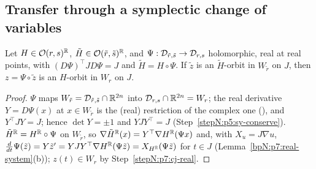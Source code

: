 \subsection{Transfer through a symplectic change of variables}\label{bpN:p7:s-transfer}

\begin{lemma}\label{bpN:p7:conjugation}
Let $H\in\mathcal O(r,s)^{\mathbb{R}}$, $\tilde H\in\mathcal O(\tilde r,\tilde s)^{\mathbb{R}}$, and $\Psi:\mathcal D_{\tilde r,\tilde s}\to\mathcal D_{r,s}$ holomorphic, real at real points, with $(D\Psi)^\top JD\Psi=J$ and $\tilde H=H\circ\Psi$. If $\tilde z$ is an $\tilde H$-orbit in $W_{\tilde r}$ on $J$, then $z=\Psi\circ\tilde z$ is an $H$-orbit in $W_r$ on $J$.
\end{lemma}
\begin{proof}
\label{stepN:p7:cj-real} $\Psi$ maps $W_{\tilde r}=\mathcal D_{\tilde r,\tilde s}\cap\mathbb{R}^{2n}$ into $\mathcal D_{r,s}\cap\mathbb{R}^{2n}=W_r$; the real derivative $Y=D\Psi(x)$ at $x\in W_{\tilde r}$ is the (real) restriction of the complex one (), and $Y^\top JY=J$; hence $\det Y=\pm1$ and $YJY^\top=J$ (Step~\ref{stepN:p5:sy-conserve}).
\label{stepN:p7:cj-chain} $\tilde H^{\mathbb{R}}=H^{\mathbb{R}}\circ\Psi$ on $W_{\tilde r}$, so $\nabla\tilde H^{\mathbb{R}}(x)=Y^\top\nabla H^{\mathbb{R}}(\Psi x)$ and, with $X_u=J\nabla u$, $\frac d{dt}\Psi(\tilde z)=Y\tilde z'=YJY^\top\nabla H^{\mathbb{R}}(\Psi\tilde z)=X_{H^{\mathbb{R}}}(\Psi\tilde z)$ for $t\in J$ (Lemma~\ref{bpN:p7:real-system}(b)); $z(t)\in W_r$ by Step~\ref{stepN:p7:cj-real}.
\end{proof}

